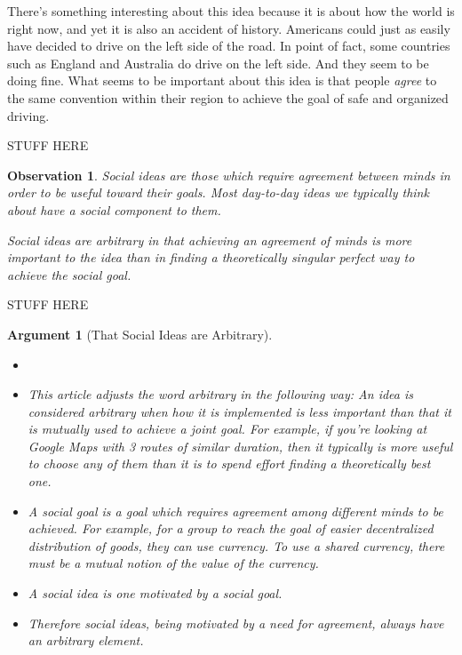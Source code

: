 \documentclass[11pt, oneside]{article}   	%
\newtheorem{obs}{Observation}
\newtheorem{argt}{Argument}
\begin{document}
There's something interesting about this idea because it is about how the world
is right now, and yet it is also an accident of history. Americans could just as
easily have decided to drive on the left side of the road. In point of fact,
some countries such as England and Australia do drive on the left side. And they
seem to be doing fine. What seems to be important about this idea is that people
{\em agree} to the same convention within their region to achieve the goal of
safe and organized driving.

STUFF HERE

\begin{obs}\label{o7}
    Social ideas are those which require agreement between minds in order to be
    useful toward their goals. Most day-to-day ideas we typically think about
    have a social component to them.

    Social ideas are {\em arbitrary} in that achieving an agreement of minds is
    more
    important to the idea than in finding a theoretically singular perfect way
    to achieve the social goal.
\end{obs}

STUFF HERE

\begin{argt}[That Social Ideas are Arbitrary]
    \label{a5}
    \normalfont
    \begin{itemize}
        \item[]
        \item This article adjusts the word {\em arbitrary} in the following
            way: An idea is considered arbitrary when {\em how}
            it is implemented is
            less important than {\em that it is mutually used} to achieve a
            joint goal.
            For
            example, if you're looking at Google Maps with 3 routes of similar
            duration, then it typically is more useful to choose any of them
            than it is to spend effort finding a theoretically best one.
        \item A social goal is a goal which requires agreement among different
            minds to be achieved. For example, for a group to reach the goal of
            easier decentralized distribution of goods, they can use currency.
            To use a shared currency, there must be a mutual notion of the
            value of the currency.
        \item A social idea is one motivated by a social goal.
        \item Therefore social ideas, being motivated by a need for agreement, 
            always have an arbitrary element.
    \end{itemize}
\end{argt}
\end{document}

